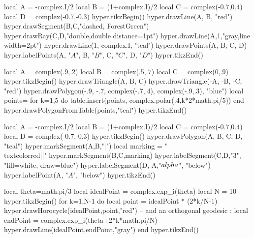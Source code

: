 \documentclass[12pt]{article}
\begin{document}
\newpage

\begin{codeandresult}
\begin{luacode*}
local A = -complex.I/2
local B = (1+complex.I)/2
local C = complex(-0.7,0.4)
local D = complex(-0.7,-0.3)
hyper.tikzBegin()
hyper.drawLine(A, B, "red")
hyper.drawSegment(B,C,"dashed, ForestGreen")
hyper.drawRay(C,D,"double,double distance=1pt")
hyper.drawLine(A,1,"gray,line width=2pt")
hyper.drawLine(1, complex.I, "teal")
hyper.drawPoints(A, B, C, D)
hyper.labelPoints(A, "$A$", B, "$B$", C, "$C$", D, "$D$")
hyper.tikzEnd()
\end{luacode*}
\end{codeandresult}

\newpage

\begin{codeandresult}
\begin{luacode*}
local A = complex(.9,.2)
local B = complex(.5,.7)
local C = complex(0,.9)
hyper.tikzBegin()
hyper.drawTriangle(A, B, C)
hyper.drawTriangle(-A, -B, -C, "red")
hyper.drawPolygon(-.9, -.7, complex(-.7,.4), complex(-.9,.3), "blue")
local points={}
for k=1,5 do
	table.insert(points, complex.polar(.4,k*2*math.pi/5))
end
hyper.drawPolygonFromTable(points,"teal")
hyper.tikzEnd()
\end{luacode*}
\end{codeandresult}

\newpage

\begin{codeandresult}
\begin{luacode*}
local A = -complex.I/2
local B = (1+complex.I)/2
local C = complex(-0.7,0.4)
local D = complex(-0.7,-0.3)
hyper.tikzBegin()
hyper.drawPolygon(A, B, C, D, "teal")
hyper.markSegment(A,B,"|")
local marking = "\\textcolor{red}{||}"
hyper.markSegment(B,C,marking)
hyper.labelSegment(C,D,"$3$", "fill=white, draw=blue")
hyper.labelSegment(D, A,"$\\alpha$", "below")
hyper.labelPoint(A, "$A$", "below")
hyper.tikzEnd()
\end{luacode*}
\end{codeandresult}

\newpage

\begin{codeandresult}
\begin{luacode*}
local theta=math.pi/3
local idealPoint = complex.exp_i(theta)
local N = 10
hyper.tikzBegin()
for k=1,N-1 do
	local point = idealPoint * (2*k/N-1)
	hyper.drawHorocycle(idealPoint,point,"red")
	-- and an orthogonal geodesic : 
	local endPoint = complex.exp_i(theta+2*k*math.pi/N)
	hyper.drawLine(idealPoint,endPoint,"gray")
end
hyper.tikzEnd()
\end{luacode*}
\end{codeandresult}
\end{document}
